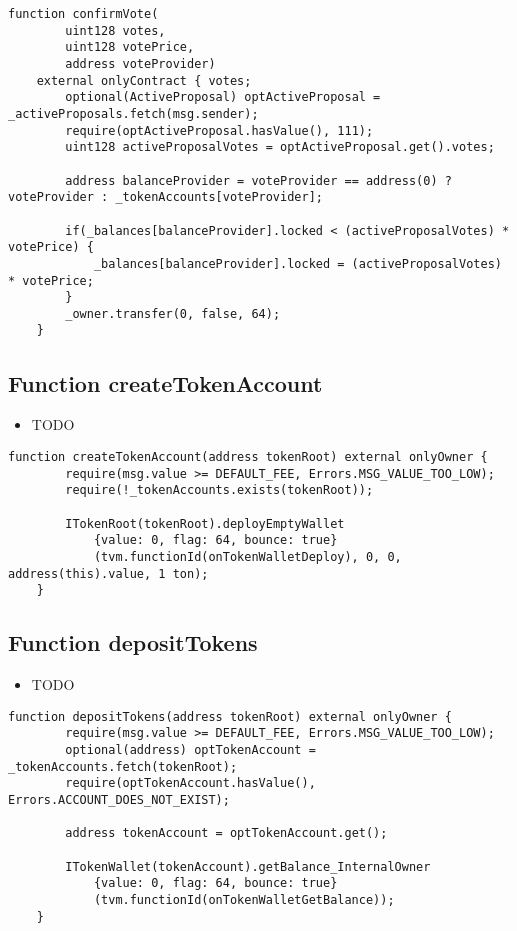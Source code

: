 \begin{lstlisting}[firstnumber=89]
    function confirmVote(
        uint128 votes,
        uint128 votePrice,
        address voteProvider)
    external onlyContract { votes;
        optional(ActiveProposal) optActiveProposal = _activeProposals.fetch(msg.sender);
        require(optActiveProposal.hasValue(), 111);
        uint128 activeProposalVotes = optActiveProposal.get().votes;

        address balanceProvider = voteProvider == address(0) ? voteProvider : _tokenAccounts[voteProvider];

        if(_balances[balanceProvider].locked < (activeProposalVotes) * votePrice) {
            _balances[balanceProvider].locked = (activeProposalVotes) * votePrice;
        }
        _owner.transfer(0, false, 64);
    }
\end{lstlisting}

\subsection{Function createTokenAccount}

\begin{itemize}
\item TODO
\end{itemize}

\begin{lstlisting}[firstnumber=228]
    function createTokenAccount(address tokenRoot) external onlyOwner {
        require(msg.value >= DEFAULT_FEE, Errors.MSG_VALUE_TOO_LOW);
        require(!_tokenAccounts.exists(tokenRoot));

        ITokenRoot(tokenRoot).deployEmptyWallet
            {value: 0, flag: 64, bounce: true}
            (tvm.functionId(onTokenWalletDeploy), 0, 0, address(this).value, 1 ton);
    }
\end{lstlisting}

\subsection{Function depositTokens}

\begin{itemize}
\item TODO
\end{itemize}

\begin{lstlisting}[firstnumber=210]
    function depositTokens(address tokenRoot) external onlyOwner {
        require(msg.value >= DEFAULT_FEE, Errors.MSG_VALUE_TOO_LOW);
        optional(address) optTokenAccount = _tokenAccounts.fetch(tokenRoot);
        require(optTokenAccount.hasValue(), Errors.ACCOUNT_DOES_NOT_EXIST);

        address tokenAccount = optTokenAccount.get();

        ITokenWallet(tokenAccount).getBalance_InternalOwner
            {value: 0, flag: 64, bounce: true}
            (tvm.functionId(onTokenWalletGetBalance));
    }
\end{lstlisting}

